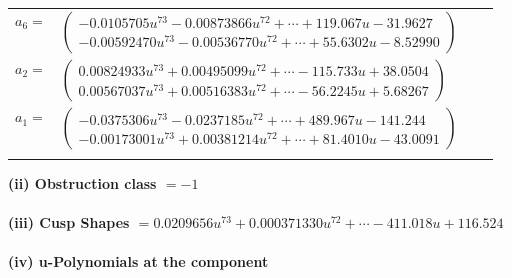 \documentclass[1p]{elsarticle_modified}
\theoremstyle{definition}
\begin{document}
\begin{tabular}{m{7pt} m{180pt} m{7pt} m{180pt} }
\flushright $a_{6}=$&$\begin{pmatrix}-0.0105705 u^{73}-0.00873866 u^{72}+\cdots+119.067 u-31.9627\\-0.00592470 u^{73}-0.00536770 u^{72}+\cdots+55.6302 u-8.52990\end{pmatrix}$ \\
\flushright $a_{2}=$&$\begin{pmatrix}0.00824933 u^{73}+0.00495099 u^{72}+\cdots-115.733 u+38.0504\\0.00567037 u^{73}+0.00516383 u^{72}+\cdots-56.2245 u+5.68267\end{pmatrix}$ \\
\flushright $a_{1}=$&$\begin{pmatrix}-0.0375306 u^{73}-0.0237185 u^{72}+\cdots+489.967 u-141.244\\-0.00173001 u^{73}+0.00381214 u^{72}+\cdots+81.4010 u-43.0091\end{pmatrix}$\\&\end{tabular}
\flushleft \textbf{(ii) Obstruction class $= -1$}\\~\\
\flushleft \textbf{(iii) Cusp Shapes $= 0.0209656 u^{73}+0.000371330 u^{72}+\cdots-411.018 u+116.524$}\\~\\
\newpage\renewcommand{\arraystretch}{1}
\flushleft \textbf{(iv) u-Polynomials at the component}\newline \\
\end{document}
